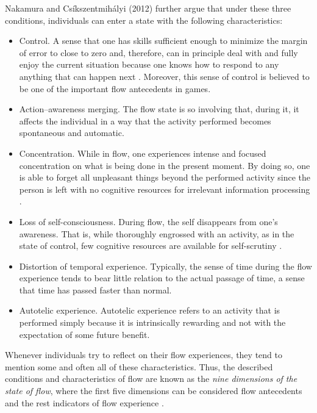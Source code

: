 \pagebreak
Nakamura and Cs\'{i}kszentmih\'{a}lyi (2012) further argue that under these three conditions, individuals can enter a state with the following characteristics:
\begin{itemize}
\item Control. A sense that one has skills sufficient enough to minimize the margin of error to close to zero and, therefore, can in principle deal with and fully enjoy the current situation because one knows how to respond to any anything that can happen next \cite{csikszentmihalyi2014flow}. Moreover, this sense of control is believed to be one of the important flow antecedents in games\cite{kiili2006evaluations}. 
\item Action–awareness merging. The flow state is so involving that, during it, it affects the individual in a way that the activity performed becomes spontaneous and automatic.
\item Concentration. While in flow, one experiences intense and focused concentration on what is being done in the present moment. By doing so, one is able to forget all unpleasant things beyond the performed activity since the person is left with no cognitive resources for irrelevant information processing \cite{kiili2006evaluations}. 
\item Loss of self-consciousness. During flow, the self disappears from one's awareness. That is, while thoroughly engrossed with an activity, as in the state of control, few cognitive resources are
available for self-scrutiny \cite{kiili2006evaluations}.
\item Distortion of temporal experience. Typically, the sense of time
during the flow experience tends to bear little relation to the actual passage of time, a
sense that time has passed faster than normal.
\item Autotelic experience. Autotelic experience refers to an activity that is performed simply because it is intrinsically rewarding and not with the expectation of some future benefit.
\end{itemize}
Whenever individuals try to reflect on their flow experiences, they tend to mention some and often all of these characteristics. Thus, the described conditions and characteristics of flow are known as the \textit{nine dimensions of the state of flow}, where the first five dimensions can be considered flow antecedents and the rest indicators of flow experience  \cite{kiili2006evaluations}.
